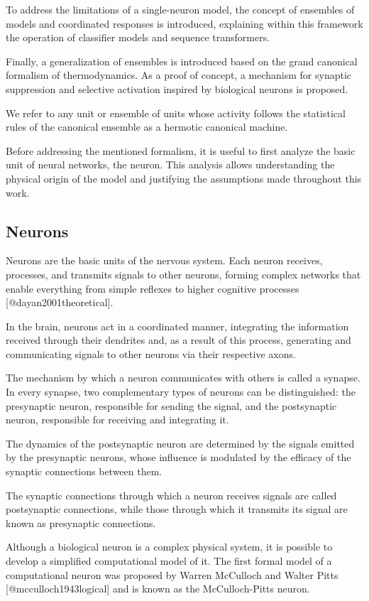 \documentclass[12pt]{article}
\begin{document}
To address the limitations of a single-neuron model, the concept of ensembles of models and coordinated responses is introduced, explaining within this framework the operation of classifier models and sequence transformers.

Finally, a generalization of ensembles is introduced based on the grand canonical formalism of thermodynamics. As a proof of concept, a mechanism for synaptic suppression and selective activation inspired by biological neurons is proposed.

We refer to any unit or ensemble of units whose activity follows the statistical rules of the canonical ensemble as a hermotic canonical machine.

Before addressing the mentioned formalism, it is useful to first analyze the basic unit of neural networks, the neuron. This analysis allows understanding the physical origin of the model and justifying the assumptions made throughout this work.

\subsection{Neurons}

Neurons are the basic units of the nervous system. Each neuron receives, processes, and transmits signals to other neurons, forming complex networks that enable everything from simple reflexes to higher cognitive processes [@dayan2001theoretical].

In the brain, neurons act in a coordinated manner, integrating the information received through their dendrites and, as a result of this process, generating and communicating signals to other neurons via their respective axons.

The mechanism by which a neuron communicates with others is called a synapse. In every synapse, two complementary types of neurons can be distinguished: the presynaptic neuron, responsible for sending the signal, and the postsynaptic neuron, responsible for receiving and integrating it.

The dynamics of the postsynaptic neuron are determined by the signals emitted by the presynaptic neurons, whose influence is modulated by the efficacy of the synaptic connections between them.

The synaptic connections through which a neuron receives signals are called postsynaptic connections, while those through which it transmits its signal are known as presynaptic connections.

Although a biological neuron is a complex physical system, it is possible to develop a simplified computational model of it. The first formal model of a computational neuron was proposed by Warren McCulloch and Walter Pitts [@mcculloch1943logical] and is known as the McCulloch-Pitts neuron.
\end{document}
